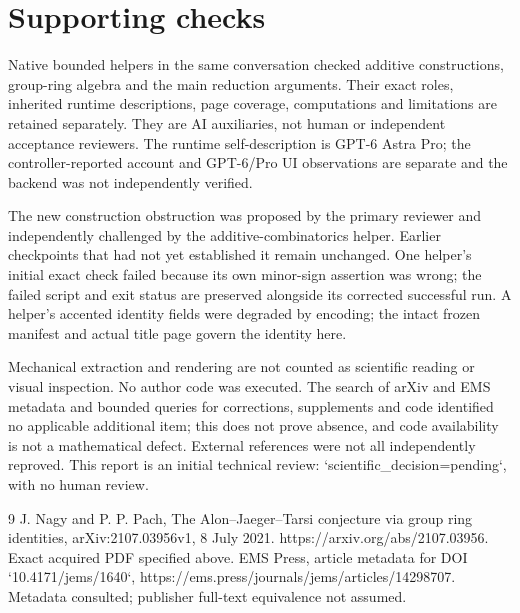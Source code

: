 \documentclass[10pt]{article}
\begin{document}
\section*{Supporting checks}
Native bounded helpers in the same conversation checked additive constructions, group-ring algebra and the main reduction arguments. Their exact roles, inherited runtime descriptions, page coverage, computations and limitations are retained separately. They are AI auxiliaries, not human or independent acceptance reviewers. The runtime self-description is GPT-6 Astra Pro; the controller-reported account and GPT-6/Pro UI observations are separate and the backend was not independently verified.\par
The new construction obstruction was proposed by the primary reviewer and independently challenged by the additive-combinatorics helper. Earlier checkpoints that had not yet established it remain unchanged. One helper’s initial exact check failed because its own minor-sign assertion was wrong; the failed script and exit status are preserved alongside its corrected successful run. A helper’s accented identity fields were degraded by encoding; the intact frozen manifest and actual title page govern the identity here.\par
Mechanical extraction and rendering are not counted as scientific reading or visual inspection. No author code was executed. The search of arXiv and EMS metadata and bounded queries for corrections, supplements and code identified no applicable additional item; this does not prove absence, and code availability is not a mathematical defect. External references were not all independently reproved. This report is an initial technical review: `scientific\_decision=pending`, with no human review.\par
9 J. Nagy and P. P. Pach, The Alon–Jaeger–Tarsi conjecture via group ring identities, arXiv:2107.03956v1, 8 July 2021. https://arxiv.org/abs/2107.03956. Exact acquired PDF specified above. EMS Press, article metadata for DOI `10.4171/jems/1640`, https://ems.press/journals/jems/articles/14298707. Metadata consulted; publisher full-text equivalence not assumed.\par
\end{document}
